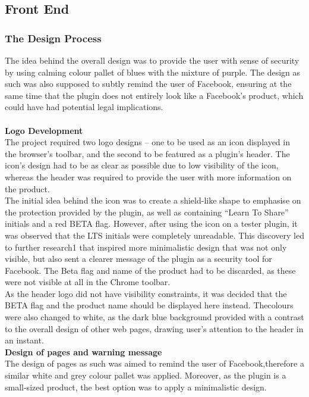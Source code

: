 \documentclass[a4paper,11pt]{article}
\begin{document}
\subsection{Front End}

\subsubsection{The Design Process}

The idea behind the overall design was to provide the user with sense of security by using calming colour pallet of blues with the mixture of purple. The design as such was also supposed to subtly remind the user of Facebook, ensuring at the same time that the plugin does not entirely look like a Facebook’s product, which could have had potential legal implications.
\\\\
\textbf{Logo Development}\\
The project required two logo designs – one to be used as an icon displayed in the browser’s toolbar, and the second to be featured as a plugin’s header. The icon’s design had to be as clear as possible due to low visibility of the icon, whereas the header was required to provide the user with more information on the product.
\\
\indent The initial idea behind the icon was to create a shield-like shape to emphasise on the protection provided by the plugin, as well as containing “Learn To Share” initials and a red BETA flag. However, after using the icon on a tester plugin, it was observed that the LTS initials were completely unreadable. This discovery led to further research1 that inspired more minimalistic design that was not only visible, but also sent a clearer message of the plugin as a security tool for Facebook. The Beta flag and name of the product had to be discarded, as these were not visible at all in the Chrome toolbar.
\\
As the header logo did not have visibility constraints, it was decided that the BETA flag and the product name should be displayed here instead. Thecolours were also changed to white, as the dark blue background provided with a contrast to the overall design of other web pages, drawing user’s attention to the header in an instant. 
\\
\textbf{Design of pages and warning message}\\
The design of pages as such was aimed to remind the user of Facebook,therefore a similar white and grey colour pallet was applied. Moreover, as the plugin is a small-sized product, the best option was to apply a minimalistic design.
\end{document}
